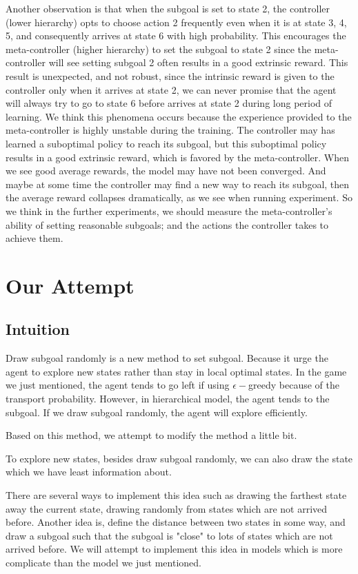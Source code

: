 \documentclass{article}
\begin{document}
\begin{spacing}{1.1}
    Another observation is that when the subgoal is set to state 2, the controller (lower hierarchy) opts to choose action 2 frequently even when it is at state 3, 4, 5, and consequently arrives at state 6 with high probability. This encourages the meta-controller (higher hierarchy) to set the subgoal to state 2 since the meta-controller will see setting subgoal 2 often results in a good extrinsic reward. This result is unexpected, and not robust, since the intrinsic reward is given to the controller only when it arrives at state 2, we can never promise that the agent will always try to go to state 6 before arrives at state 2 during long period of learning. We think this phenomena occurs because the experience provided to the meta-controller is highly unstable during the training. The controller may has learned a suboptimal policy to reach its subgoal, but this suboptimal policy results in a good extrinsic reward, which is favored by the meta-controller. When we see good average rewards, the model may have not been converged. And maybe at some time the controller may find a new way to reach its subgoal, then the average reward collapses dramatically, as we see when running experiment. So we think in the further experiments, we should measure the meta-controller's ability of setting reasonable subgoals; and the actions the controller takes to achieve them.

    \section{Our Attempt}

    \subsection{Intuition}

    Draw subgoal randomly is a new method to set subgoal. Because it urge the agent to explore new states rather than stay in local optimal states. In the game we just mentioned, the agent tends to go left if using $\epsilon-$greedy because of the transport probability. However, in hierarchical model, the agent tends to the subgoal. If we draw subgoal randomly, the agent will explore efficiently.

    Based on this method, we attempt to modify the method a little bit.

    To explore new states, besides draw subgoal randomly, we can also draw the state which we have least information about.

    There are several ways to implement this idea such as drawing the farthest state away the current state, drawing randomly from states which are not arrived before. Another idea is, define the distance between two states in some way, and draw a subgoal such that the subgoal is "close" to lots of states which are not arrived before. We will attempt to implement this idea in models which is more complicate than the model we just mentioned.


\end{spacing}
\end{document}

